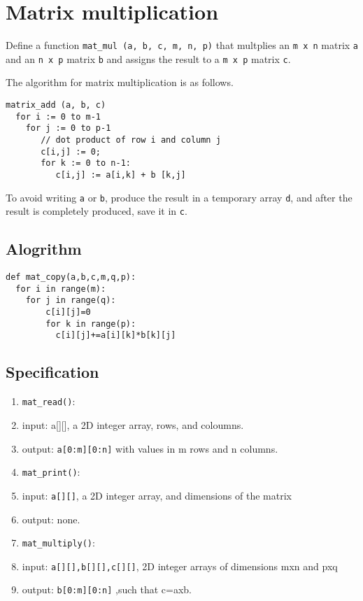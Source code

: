 \documentclass[11pt]{article}
\begin{document}
\section{Matrix multiplication}
\label{sec-8}
Define a function \texttt{mat\_mul (a, b, c, m, n, p)} that
multplies an \texttt{m x n} matrix \texttt{a} and an \texttt{n x p} matrix \texttt{b}
and assigns the result to a \texttt{m x p} matrix \texttt{c}.

The algorithm for matrix multiplication is as follows.
\linespread{1}
\begin{verbatim}
matrix_add (a, b, c)
  for i := 0 to m-1
    for j := 0 to p-1
       // dot product of row i and column j
       c[i,j] := 0;
       for k := 0 to n-1:
          c[i,j] := a[i,k] + b [k,j]
\end{verbatim}
\linespread{1.2}
To avoid writing \texttt{a} or \texttt{b}, produce the result in a
temporary array \texttt{d}, and after the result is completely
produced, save it in \texttt{c}.
\linespread{1}
\subsection*{Alogrithm}
\label{sec-8-1}
\begin{verbatim}
def mat_copy(a,b,c,m,q,p):
  for i in range(m):
    for j in range(q):
        c[i][j]=0
        for k in range(p):
          c[i][j]+=a[i][k]*b[k][j]
\end{verbatim}
\subsection*{Specification}
\label{sec-8-2}
\begin{enumerate}
\item \texttt{mat\_read()}:
\item input: a[][], a 2D integer array, rows, and coloumns.
\item output: \texttt{a[0:m][0:n]} with values in m rows and n columns.
\item \texttt{mat\_print()}:
\item input: \texttt{a[][]}, a 2D integer array, and dimensions of the matrix
\item output: none.
\item \texttt{mat\_multiply()}:
\item input: \texttt{a[][],b[][],c[][]}, 2D integer arrays of dimensions mxn and pxq
\item output: \texttt{b[0:m][0:n]} ,such that c=axb.
\end{enumerate}
\end{document}
